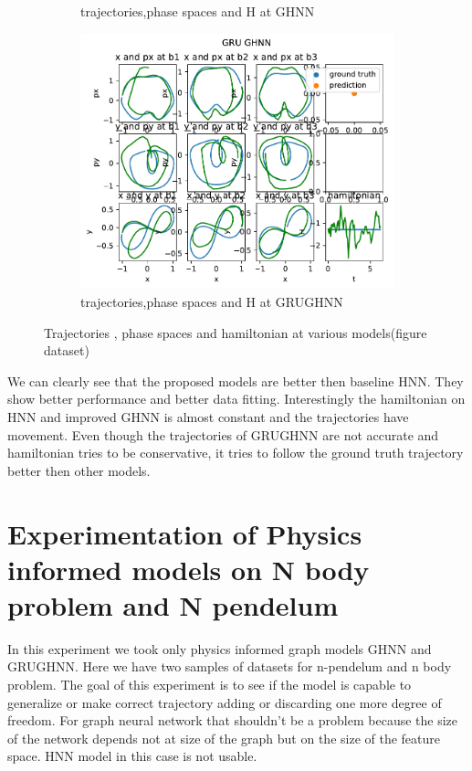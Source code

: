 \begin{figure}[H]
\begin{subfigure}[b]{0.3\textwidth}
		\caption{trajectories,phase spaces and H at GHNN}
	\end{subfigure}
	\hfill
	\begin{subfigure}[b]{0.3\textwidth}
		\centering
		\includegraphics[width=\textwidth]{chapters/chapter5/fignew_gru_ghnn_traj.pdf}
		\caption{trajectories,phase spaces and H at GRUGHNN}
	\end{subfigure}
	
	\caption{Trajectories , phase spaces and hamiltonian at various models(figure dataset)}
	\label{fig_traj}
\end{figure}
We can clearly see that the proposed models are better then baseline HNN. They show better performance and better data fitting. Interestingly the hamiltonian on HNN and improved GHNN is almost constant and the trajectories have movement. Even though the trajectories of GRUGHNN are not accurate and hamiltonian tries to be conservative, it tries to follow the ground truth trajectory better then other models.  



\section{Experimentation of Physics informed models on N body problem and N pendelum}
In this experiment we took only physics informed graph models GHNN and GRUGHNN. Here we have two samples of datasets for n-pendelum and n body problem. The goal of this experiment is to see if the model is capable to generalize or make correct trajectory adding or discarding one more degree of freedom. For graph neural network that shouldn't be a problem because the size of the network depends not at size of the graph but on the size of the feature space. HNN model in this case is not usable.

